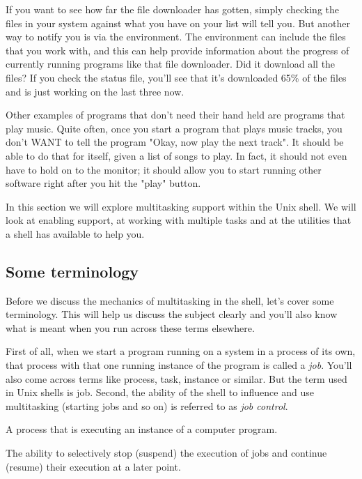 If you want to see how far the file downloader has gotten, simply checking the
files in your system against what you have on your list will tell you. But
another way to notify you is via the environment. The environment can include
the files that you work with, and this can help provide information about the
progress of currently running programs like that file downloader. Did it
download all the files? If you check the status file, you'll see that it's
downloaded 65\% of the files and is just working on the last three now.

Other examples of programs that don't need their hand held are programs that
play music. Quite often, once you start a program that plays music tracks, you
don't WANT to tell the program "Okay, now play the next track". It should be
able to do that for itself, given a list of songs to play. In fact, it should
not even have to hold on to the monitor; it should allow you to start running
other software right after you hit the "play" button.

In this section we will explore multitasking support within the Unix shell. We
will look at enabling support, at working with multiple tasks and at the
utilities that a shell has available to help you.

\subsection{Some terminology} Before we discuss the mechanics of
multitasking in the shell, let's cover some terminology. This will help us
discuss the subject clearly and you'll also know what is meant when you run
across these terms elsewhere.

First of all, when we start a program running on a system in a process of its
own, that process with that one running instance of the program is called a
\textit{job}. You'll also come across terms like process, task, instance or
similar. But the term used in Unix shells is job. Second, the ability of the
shell to influence and use multitasking (starting jobs and so on) is referred
to as \textit{job control}.

\begin{description}
\setlength{\leftmargin}{0pt}
\setlength{\itemsep}{0pt}
\setlength{\parsep}{0pt}
\setlength{\parskip}{0pt}
\item[Job] A process that is executing an instance of a computer program.
\item[Job control] The ability to selectively stop (suspend) the execution of jobs and continue (resume) their execution at a later point.
\end{description}

